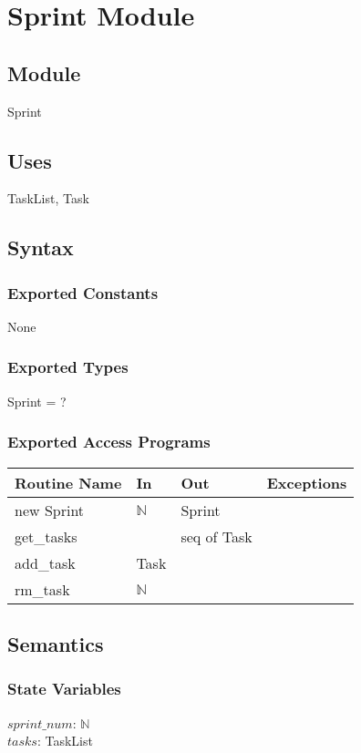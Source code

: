 \documentclass[12pt, titlepage]{article}
\begin{document}
\section* {Sprint Module}

\subsection*{Module}
Sprint

\subsection* {Uses}
TaskList, Task 

\subsection* {Syntax}
\subsubsection* {Exported Constants}
None

\subsubsection* {Exported Types}
Sprint = ?

\subsubsection* {Exported Access Programs}
\begin{tabular}{|l|l|l|l|}
    \hline
    \textbf{Routine Name} & \textbf{In} & \textbf{Out} & \textbf{Exceptions} \\
    \hline
    new Sprint & $\mathbb{N}$ & Sprint & \\
    \hline
    get\_tasks & & seq of Task &\\
    \hline
    add\_task & Task & & \\
    \hline
    rm\_task & $\mathbb{N}$ & &\\
    \hline
\end{tabular}

\subsection*{Semantics}
\subsubsection*{State Variables}
$sprint\_num$: $\mathbb{N}$\\
$tasks$: TaskList
\end{document}
